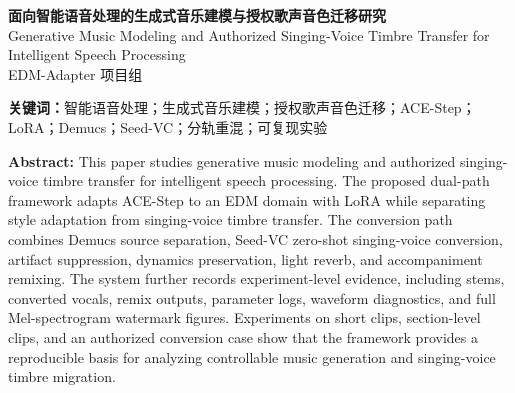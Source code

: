 \documentclass[UTF8,a4paper,zihao=-4,fontset=none]{ctexart}
\begin{document}
\pagestyle{plain}
\begin{center}
{\LARGE\bfseries 面向智能语音处理的生成式音乐建模与授权歌声音色迁移研究}\\[0.5em]
{\large Generative Music Modeling and Authorized Singing-Voice Timbre Transfer for Intelligent Speech Processing}\\[0.8em]
EDM-Adapter 项目组
\end{center}
\begin{abstract}
随着深度生成模型从语音识别、语音增强和语音合成扩展到音乐生成、歌声音色迁移和多轨音频编辑，智能语音处理的研究对象正在由单一语音信号转向包含旋律、节奏、音色、结构和混音关系的复杂音频对象。针对文本到音乐生成难以在低资源条件下稳定适配目标风格、歌声音色转换容易混入伴奏泄漏和后处理伪影、实验结果缺乏可复核证据链等问题，本文提出一种面向智能语音处理的双路径生成式音频建模方法。在音乐生成路径中，系统以 ACE-Step 为基础模型，采用 LoRA 对目标 EDM 数据域进行参数高效适配，并通过同 seed baseline 控制随机采样因素；在授权歌声音色迁移路径中，系统以 Demucs 完成人声与伴奏分离，以 Seed-VC 完成零样本歌声音色迁移，并在转换后执行去沙哑、能量包络保持、轻混响和伴奏重混。为提升论文实验的可验证性，本文将输入音频、分离音轨、转换人声、重混结果、参数记录、日志、波形频谱诊断图和完整 Mel 水印图组织为统一实验记录单元。实验数据包含 6016 条 8 秒 EDM 片段，训练/验证/测试划分为 4833/557/626；另构建 360 条 15 秒段落级增强片段，覆盖 drop=130, breakdown=86, build-up=65, intro=36, loop=25, outro=18 等结构标签。授权音色迁移实验以匿名样例 E-VC-01 验证端到端链路，输出时长 183.4 秒，采样率 44100 Hz，BPM=110.0，RMS=0.1392，低频比例=0.4498，Seed-VC 运行代价 RTF=20.71。结果表明，该方法能够把目标风格适配、歌声音色迁移、分轨重混和 AI 生成标识纳入可追踪、可复核的智能音频处理流程。
\end{abstract}
\noindent\textbf{关键词：}智能语音处理；生成式音乐建模；授权歌声音色迁移；ACE-Step；LoRA；Demucs；Seed-VC；分轨重混；可复现实验

\noindent\textbf{Abstract:} This paper studies generative music modeling and authorized singing-voice timbre transfer for intelligent speech processing. The proposed dual-path framework adapts ACE-Step to an EDM domain with LoRA while separating style adaptation from singing-voice timbre transfer. The conversion path combines Demucs source separation, Seed-VC zero-shot singing-voice conversion, artifact suppression, dynamics preservation, light reverb, and accompaniment remixing. The system further records experiment-level evidence, including stems, converted vocals, remix outputs, parameter logs, waveform diagnostics, and full Mel-spectrogram watermark figures. Experiments on short clips, section-level clips, and an authorized conversion case show that the framework provides a reproducible basis for analyzing controllable music generation and singing-voice timbre migration.
\end{document}
